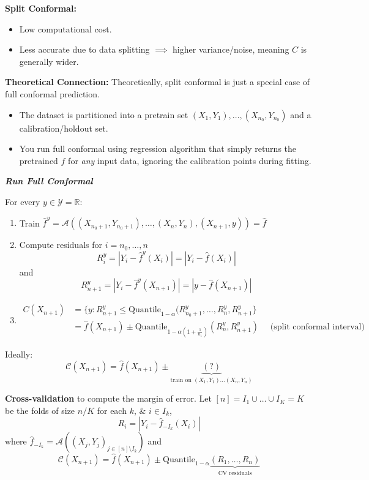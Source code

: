 \textbf{Split Conformal:}
\begin{itemize}
    \item Low computational cost.
    \item Less accurate due to data splitting $\implies$ higher variance/noise, meaning $C$ is generally wider.
\end{itemize}

\noindent \textbf{Theoretical Connection:}
Theoretically, split conformal is just a special case of full conformal prediction.
\begin{itemize}
    \item The dataset is partitioned into a pretrain set $(X_1, Y_1), \dots, (X_{n_0}, Y_{n_0})$ and a calibration/holdout set.
    \item You run full conformal using regression algorithm that simply returns the pretrained $\hat{f}$ for \textit{any} input data, ignoring the calibration points during fitting.
\end{itemize}

\emph{\textbf{Run Full Conformal}}

For every $y\in \mathcal{Y}=\mathbb{R}\colon$
\begin{enumerate}
    \item Train $\hat{f}^y = \mathcal{A}((X_{n_0+1},Y_{n_0+1}), \dots, (X_n,Y_n),(X_{n+1},y)) =\hat{f}$
    \item Compute residuals for $i=n_0,\dots, n$
    $$
    R^y_i = |Y_i-\hat{f}^y(X_i)|= |Y_i-\hat{f}(X_i)|
    $$
    and 
    $$
    R^y_{n+1} = |Y_i-\hat{f}^y(X_{n+1})|= |y-\hat{f}(X_{n+1})|
    $$
    \item 
    \begin{align*}
        C(X_{n+1}) &= \{y\colon R^y_{n+1}\leq \text{Quantile}_{1-\alpha}(R_{n_0+1}^y,\dots, R^y_n,R^y_{n+1} \} \\
        &=\hat{f}(X_{n+1}) \pm \text{Quantile}_{1-\alpha\left(1+\frac{1}{n_1}\right)}( R^y_n,R^y_{n+1} ) \quad \text{ (split conformal interval) }
    \end{align*}
\end{enumerate}

Ideally:
\[ \mathcal{C}(X_{n+1}) = \hat{f}(X_{n+1}) \pm \underbrace{(\text{?})}_{\text{train on } (X_1, Y_1) \dots (X_n, Y_n)} \]

\textbf{Cross-validation} to compute the margin of error. Let $[n] = I_1 \cup \dots \cup I_K = K $ be the folds of size $n/K$ for each $k$, \& $i \in I_k$,
\[ R_i = |Y_i - \hat{f}_{-I_k}(X_i)| \]
where $\hat{f}_{-I_k} = \mathcal{A}((X_j, Y_j)_{j \in [n] \setminus I_k})$ and
\[ \mathcal{C}(X_{n+1}) = \hat{f}(X_{n+1}) \pm \text{Quantile}_{1-\alpha}\underbrace{(R_1, \dots, R_n)}_{\text{CV residuals}} \]

